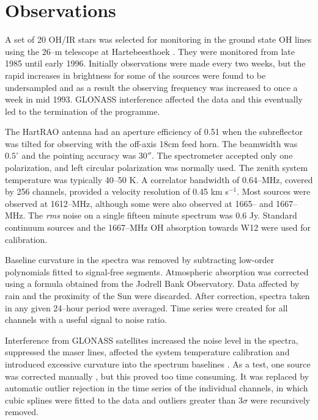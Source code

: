 \documentclass[usenatbib,usegraphicx]{mn2e}
\begin{document}
\section{Observations}

A set of 20 OH/IR stars was selected for monitoring in the ground state OH
lines using the 26--m telescope at Hartebeesthoek \citep{West98}.  They
were monitored from late 1985 until early 1996.  
Initially observations were made
every two weeks, but the rapid increases in brightness
for some of the sources were found to be undersampled and as a result the
observing frequency was increased to once a week in mid 1993.  
GLONASS interference
affected the data
\citep{ComWestGay94} and this eventually led to the termination of the
programme.

The HartRAO antenna had an aperture efficiency of 0.51 when the subreflector
was tilted for observing with the off-axis 18cm feed horn.  The beamwidth
was $0.5^\circ$ and the pointing accuracy was $30''$.  The spectrometer 
accepted only one polarization, and left circular
polarization was normally used.  The zenith system temperature was typically
40--50 K.  A correlator bandwidth of 0.64--MHz, covered by 256
channels, provided a velocity resolution of 0.45 km s$^{-1}$.  Most sources
were observed at 1612--MHz, although some were also observed at 1665-- and
1667--MHz.  The {\em rms\/} noise on a single fifteen minute
spectrum was 0.6 Jy.  Standard continuum sources
\citep{Ott94} and the 1667--MHz OH absorption towards W12 were used for
calibration.

Baseline curvature in the spectra was removed by subtracting low-order
polynomials fitted to signal-free segments. Atmospheric absorption was
corrected using a formula obtained from the Jodrell Bank Observatory.  Data
affected by rain and the proximity of the Sun were discarded.  After
correction, spectra taken in any given 24--hour period were averaged.  Time
series were created for all channels with a useful signal to noise ratio.

Interference from GLONASS satellites increased the noise level in the
spectra, suppressed the maser lines, affected the system temperature
calibration and introduced excessive curvature into the spectrum baselines
\citep{ComWestGay94}.  As a test, one source was corrected manually
\citep{West98}, but this proved too time consuming.  It was replaced by
automatic outlier rejection in the time series of the individual channels, 
in which cubic splines were fitted to the data
and outliers greater than 3$\sigma$ were recursively removed.
\end{document}
